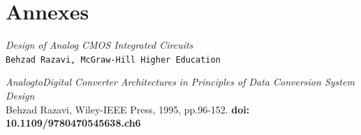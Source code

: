 \documentclass[11pt]{article}
\begin{document}
\section{Annexes}

\clearpage


\begin{thebibliography}{9}
\textit{Design of Analog CMOS Integrated Circuits}
\\\texttt{Behzad Razavi, McGraw-Hill Higher Education }

\textit{AnalogtoDigital Converter Architectures}
\textit{in Principles of Data Conversion System Design}\\
Behzad Razavi, Wiley-IEEE Press, 1995, pp.96-152. \textbf{doi: 10.1109/9780470545638.ch6}


\end{thebibliography}
\end{document}
